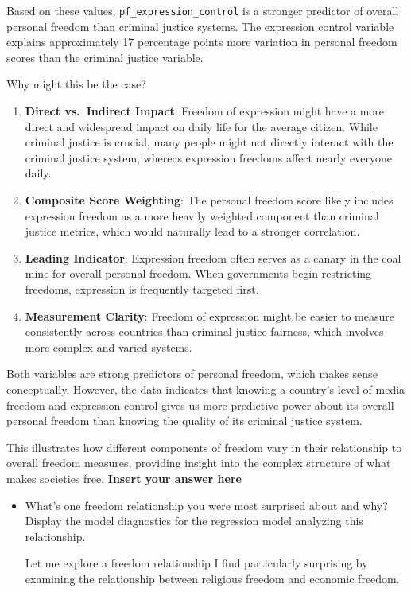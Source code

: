 \documentclass[
]{article}
\begin{document}
Based on these values, \texttt{pf\_expression\_control} is a stronger
predictor of overall personal freedom than criminal justice systems. The
expression control variable explains approximately 17 percentage points
more variation in personal freedom scores than the criminal justice
variable.

Why might this be the case?

\begin{enumerate}
\def\labelenumi{\arabic{enumi}.}
\item
  \textbf{Direct vs.~Indirect Impact}: Freedom of expression might have
  a more direct and widespread impact on daily life for the average
  citizen. While criminal justice is crucial, many people might not
  directly interact with the criminal justice system, whereas expression
  freedoms affect nearly everyone daily.
\item
  \textbf{Composite Score Weighting}: The personal freedom score likely
  includes expression freedom as a more heavily weighted component than
  criminal justice metrics, which would naturally lead to a stronger
  correlation.
\item
  \textbf{Leading Indicator}: Expression freedom often serves as a
  canary in the coal mine for overall personal freedom. When governments
  begin restricting freedoms, expression is frequently targeted first.
\item
  \textbf{Measurement Clarity}: Freedom of expression might be easier to
  measure consistently across countries than criminal justice fairness,
  which involves more complex and varied systems.
\end{enumerate}

Both variables are strong predictors of personal freedom, which makes
sense conceptually. However, the data indicates that knowing a country's
level of media freedom and expression control gives us more predictive
power about its overall personal freedom than knowing the quality of its
criminal justice system.

This illustrates how different components of freedom vary in their
relationship to overall freedom measures, providing insight into the
complex structure of what makes societies free. \textbf{Insert your
answer here}

\begin{itemize}
\item
  What's one freedom relationship you were most surprised about and why?
  Display the model diagnostics for the regression model analyzing this
  relationship.

  Let me explore a freedom relationship I find particularly surprising
  by examining the relationship between religious freedom and economic
  freedom.
\end{itemize}
\end{document}
